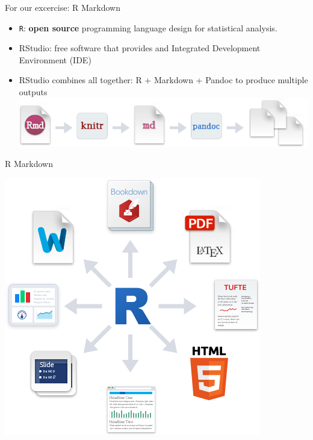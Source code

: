 \documentclass[ignorenonframetext,]{beamer}
\providecommand{\tightlist}{%
  \setlength{\itemsep}{0pt}\setlength{\parskip}{0pt}}
\begin{document}
\begin{frame}[fragile]{For our excercise: R Markdown}
\protect\hypertarget{for-our-excercise-r-markdown}{}

\begin{itemize}
\tightlist
\item
  \texttt{R}: \textbf{open source} programming language design for
  statistical analysis.\\
\item
  RStudio: free software that provides and Integrated Development
  Environment (IDE)\\
\item
  RStudio combines all together: R + Markdown + Pandoc to produce
  multiple outputs \includegraphics{../Images/RMarkdownFlow.png}
\end{itemize}

\end{frame}

\begin{frame}{R Markdown}
\protect\hypertarget{r-markdown}{}

\includegraphics{../Images/RMarkdownOutputFormats.png}

\end{frame}
\end{document}
